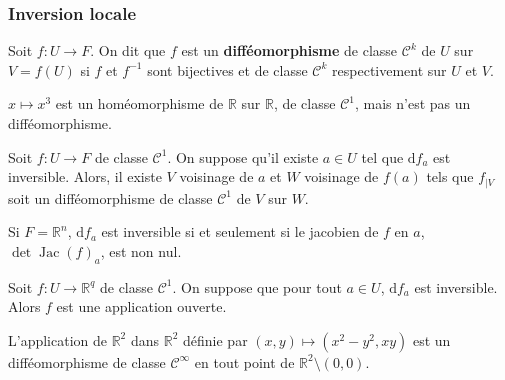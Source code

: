 	\subsubsection{Inversion locale}
	
	
	\begin{definition}
		\label{key}
		Soit $f : U \rightarrow F$. On dit que $f$ est un \textbf{difféomorphisme} de classe $\mathcal{C}^k$ de $U$ sur $V = f(U)$ si $f$ et $f^{-1}$ sont bijectives et de classe $\mathcal{C}^k$ respectivement sur $U$ et $V$.
	\end{definition}
	
	\begin{example}
		$x \mapsto x^3$ est un homéomorphisme de $\mathbb{R}$ sur $\mathbb{R}$, de classe $\mathcal{C}^1$, mais n'est pas un difféomorphisme.
	\end{example}
	
	
	\begin{theorem}
		Soit $f : U \rightarrow F$ de classe $\mathcal{C}^1$. On suppose qu'il existe $a \in U$ tel que $\mathrm{d}f_a$ est inversible.
		\newpar
		Alors, il existe $V$ voisinage de $a$ et $W$ voisinage de $f(a)$ tels que $f_{|V}$ soit un difféomorphisme de classe $\mathcal{C}^1$ de $V$ sur $W$.
	\end{theorem}
	
	\begin{remark}
		Si $F = \mathbb{R}^n$, $\mathrm{d}f_a$ est inversible si et seulement si le jacobien de $f$ en $a$, $\det \operatorname{Jac}(f)_a$, est non nul.
	\end{remark}
	
	\begin{corollary}
		Soit $f : U \rightarrow \mathbb{R}^q$ de classe $\mathcal{C}^1$. On suppose que pour tout $a \in U$, $\mathrm{d}f_a$ est inversible. Alors $f$ est une application ouverte.
	\end{corollary}
	
	
	\begin{example}
		\label{214-1}
		L'application de $\mathbb{R}^2$ dans $\mathbb{R}^2$ définie par $(x, y) \mapsto (x^2-y^2, xy)$ est un difféomorphisme de classe $\mathcal{C}^\infty$ en tout point de $\mathbb{R}^2 \setminus (0,0)$.
	\end{example}
	
	
